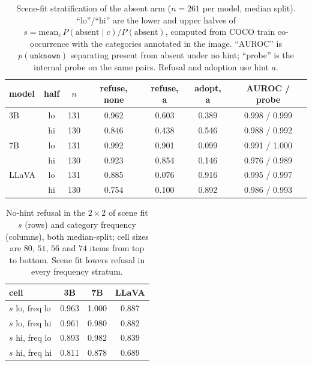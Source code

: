 \documentclass[10pt]{article}
\newcommand{\unknown}{\texttt{unknown}}
\newcommand{\punk}{p(\unknown)}
\begin{document}
\begin{table}[h]
\centering
\small
\setlength{\tabcolsep}{4pt}
\caption{Scene-fit stratification of the absent arm ($n=261$ per model, median split). ``lo''/``hi'' are the lower and upper halves of $s=\mathrm{mean}_c\,P(\text{absent}\mid c)/P(\text{absent})$, computed from COCO train co-occurrence with the categories annotated in the image. ``AUROC'' is $\punk$ separating present from absent under no hint; ``probe'' is the internal probe on the same pairs. Refusal and adoption use hint $a$.}
\label{tab:scenefit}
\begin{tabular}{lcccccc}
\toprule
model & half & $n$ & refuse, none & refuse, a & adopt, a & AUROC / probe \\
\midrule
3B & lo & 131 & 0.962 & 0.603 & 0.389 & 0.998 / 0.999 \\
   & hi & 130 & 0.846 & 0.438 & 0.546 & 0.988 / 0.992 \\
\midrule
7B & lo & 131 & 0.992 & 0.901 & 0.099 & 0.991 / 1.000 \\
   & hi & 130 & 0.923 & 0.854 & 0.146 & 0.976 / 0.989 \\
\midrule
LLaVA & lo & 131 & 0.885 & 0.076 & 0.916 & 0.995 / 0.997 \\
      & hi & 130 & 0.754 & 0.100 & 0.892 & 0.986 / 0.993 \\
\bottomrule
\end{tabular}
\end{table}

\begin{table}[h]
\centering
\small
\caption{No-hint refusal in the $2\times2$ of scene fit $s$ (rows) and category frequency (columns), both median-split; cell sizes are $80$, $51$, $56$ and $74$ items from top to bottom. Scene fit lowers refusal in every frequency stratum.}
\label{tab:scenefit2x2}
\begin{tabular}{lccc}
\toprule
cell & 3B & 7B & LLaVA \\
\midrule
$s$ lo, freq lo & 0.963 & 1.000 & 0.887 \\
$s$ lo, freq hi & 0.961 & 0.980 & 0.882 \\
$s$ hi, freq lo & 0.893 & 0.982 & 0.839 \\
$s$ hi, freq hi & 0.811 & 0.878 & 0.689 \\
\bottomrule
\end{tabular}
\end{table}
\end{document}
